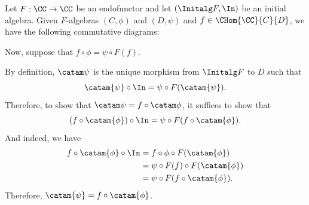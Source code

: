 \begin{solution}\label{sol:fusion-property}
	Let $ F : \CC \to \CC $ be an endofunctor and let $ (\Initalg F, \In) $ be an initial algebra. Given $F$-algebras $(C,\phi)$ and $(D,\psi)$ and $ f \in \CHom{\CC}{C}{D} $, we have the following commutative diagrams:
	\begin{center}
		\quad
	\end{center}
	Now, suppose that $ f \circ \phi = \psi \circ F(f) $.

	By definition, $ \catam \psi $ is the unique morphism from $ \Initalg F $ to $ D $ such that 
	\[ \catam{\psi} \circ \In = \psi \circ F(\catam{\psi}). \]
	Therefore, to show that $ \catam \psi = f \circ \catam \phi $, it suffices to show that
	\[ (f \circ \catam{\phi}) \circ \In = \psi \circ F(f \circ \catam{\phi}). \]
	And indeed, we have
	\begin{align*}
		f \circ \catam{\phi} \circ \In &= f \circ \phi \circ F(\catam{\phi})\\
		&= \psi \circ F(f) \circ F(\catam{\phi})\\
		&= \psi \circ F(f \circ \catam{\phi}).
	\end{align*}
	Therefore, $ \catam{\psi} = f \circ \catam{\phi} $.
\end{solution}

